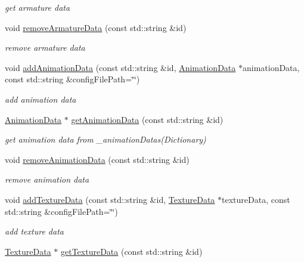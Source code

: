 \begin{DoxyCompactItemize}
\begin{DoxyCompactList}\small\item\em get armature data \end{DoxyCompactList}\item 
void \hyperlink{classcocostudio_1_1ArmatureDataManager_ab749f66043b0dd603720ff8c31f2a3b6}{remove\+Armature\+Data} (const std\+::string \&id)
\begin{DoxyCompactList}\small\item\em remove armature data \end{DoxyCompactList}\item 
void \hyperlink{classcocostudio_1_1ArmatureDataManager_a36a1eb7cdc144ce7ee0a17bcc3f5726d}{add\+Animation\+Data} (const std\+::string \&id, \hyperlink{classcocostudio_1_1AnimationData}{Animation\+Data} $\ast$animation\+Data, const std\+::string \&config\+File\+Path=\char`\"{}\char`\"{})
\begin{DoxyCompactList}\small\item\em add animation data \end{DoxyCompactList}\item 
\hyperlink{classcocostudio_1_1AnimationData}{Animation\+Data} $\ast$ \hyperlink{classcocostudio_1_1ArmatureDataManager_aa16bcd30c063c4143787fe799a6f4a45}{get\+Animation\+Data} (const std\+::string \&id)
\begin{DoxyCompactList}\small\item\em get animation data from \+\_\+animation\+Datas(\+Dictionary) \end{DoxyCompactList}\item 
void \hyperlink{classcocostudio_1_1ArmatureDataManager_a7355fd9a994fe9a51bc7b0ce35cb9008}{remove\+Animation\+Data} (const std\+::string \&id)
\begin{DoxyCompactList}\small\item\em remove animation data \end{DoxyCompactList}\item 
void \hyperlink{classcocostudio_1_1ArmatureDataManager_aed885f4d9ab821f83f3a3826655e3325}{add\+Texture\+Data} (const std\+::string \&id, \hyperlink{classcocostudio_1_1TextureData}{Texture\+Data} $\ast$texture\+Data, const std\+::string \&config\+File\+Path=\char`\"{}\char`\"{})
\begin{DoxyCompactList}\small\item\em add texture data \end{DoxyCompactList}\item 
\hyperlink{classcocostudio_1_1TextureData}{Texture\+Data} $\ast$ \hyperlink{classcocostudio_1_1ArmatureDataManager_a5516347b007b20f6a6f685a630ba76b1}{get\+Texture\+Data} (const std\+::string \&id)

\end{DoxyCompactItemize}
